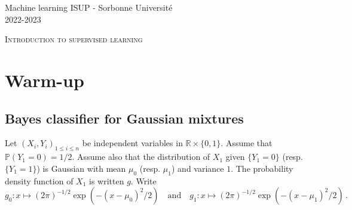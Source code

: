 \documentclass[a4paper,10pt,fleqn]{article}
\newcommand{\eqsp}{\,}
\newcommand{\1}{\ensuremath{\mathbbm{1}}}
\begin{document}
\noindent Machine learning \hfill ISUP - Sorbonne Universit\'e \\
 2022-2023

\noindent\hrulefill

\begin{center}
\textsc{Introduction to supervised learning}
\end{center}
\hrulefill

\medskip


\section{Warm-up}
\subsection{Bayes classifier for Gaussian mixtures}
Let $(X_i,Y_i)_{1\leqslant i\leqslant n}$ be independent variables in $\mathbb{R}\times \{0,1\}$. Assume that  $\mathbb{P}(Y_1 = 0) = 1/2$. Assume also that the distribution of $X_1$ given $\{Y_1= 0\}$ (resp. $\{Y_1= 1\}$) is Gaussian with mean $\mu_0$ (resp. $\mu_1$) and variance $1$. The probability density function of $X_1$ is written $g$. Write
$$
g_0: x \mapsto (2\pi)^{-1/2}\exp(-(x-\mu_0)^2/2)\quad\mathrm{and} \quad g_1: x \mapsto (2\pi)^{-1/2}\exp(-(x-\mu_1)^2/2)\eqsp.
$$
\end{document}
